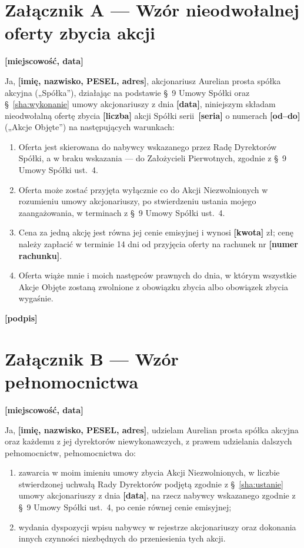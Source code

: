 \documentclass[12pt,a4paper]{report}
\newcommand{\field}[1]{\textbf{[#1]}}
\newcommand{\CompanyFull}{Aurelian prosta spółka akcyjna}
\newcommand{\US}[1]{§~#1 Umowy Spółki}
\begin{document}
\newpage
\section*{Załącznik A --- Wzór nieodwołalnej oferty zbycia akcji}

\field{miejscowość, data}

Ja, \field{imię, nazwisko, PESEL, adres}, akcjonariusz \CompanyFull{} („Spółka”), działając na podstawie \US{9} oraz §~\ref{sha:wykonanie} umowy akcjonariuszy z dnia \field{data}, niniejszym składam nieodwołalną ofertę zbycia \field{liczba} akcji Spółki serii~\field{seria} o numerach \field{od--do} („Akcje Objęte”) na następujących warunkach:

\begin{enumerate}
  \item Oferta jest skierowana do nabywcy wskazanego przez Radę Dyrektorów Spółki, a w braku wskazania --- do Założycieli Pierwotnych, zgodnie z \US{9} ust.~4.
  \item Oferta może zostać przyjęta wyłącznie co do Akcji Niezwolnionych w rozumieniu umowy akcjonariuszy, po stwierdzeniu ustania mojego zaangażowania, w terminach z \US{9} ust.~4.
  \item Cena za jedną akcję jest równa jej cenie emisyjnej i wynosi \field{kwota} zł; cenę należy zapłacić w terminie 14 dni od przyjęcia oferty na rachunek nr \field{numer rachunku}.
  \item Oferta wiąże mnie i moich następców prawnych do dnia, w którym wszystkie Akcje Objęte zostaną zwolnione z obowiązku zbycia albo obowiązek zbycia wygaśnie.
\end{enumerate}

\field{podpis}

\newpage
\section*{Załącznik B --- Wzór pełnomocnictwa}

\field{miejscowość, data}

Ja, \field{imię, nazwisko, PESEL, adres}, udzielam \CompanyFull{} oraz każdemu z jej dyrektorów niewykonawczych, z prawem udzielania dalszych pełnomocnictw, pełnomocnictwa do:

\begin{enumerate}
  \item zawarcia w moim imieniu umowy zbycia Akcji Niezwolnionych, w liczbie stwierdzonej uchwałą Rady Dyrektorów podjętą zgodnie z §~\ref{sha:ustanie} umowy akcjonariuszy z dnia \field{data}, na rzecz nabywcy wskazanego zgodnie z \US{9} ust.~4, po cenie równej cenie emisyjnej;
  \item wydania dyspozycji wpisu nabywcy w rejestrze akcjonariuszy oraz dokonania innych czynności niezbędnych do przeniesienia tych akcji.
\end{enumerate}
\end{document}
